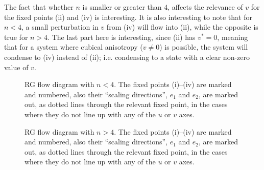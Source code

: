 \documentclass[11pt,letter, swedish, english
]{article}
\begin{document}
The fact that whether $n$ is smaller or greater than $4$, affects the
relevance of $v$ for the fixed points (ii) and (iv) is
interesting. It is also interesting to note that for $n<4$, a small
perturbation in $v$ from (iv) will flow into (ii), while the opposite
is true for $n>4$. The last part here is interesting, since (ii) has
$v^*=0$, meaning that for a system where cubical anisotropy ($v\neq0$)
is possible, the system will condense to (iv) instead of (ii);
i.e. condensing to a state with a clear non-zero value of $v$. 




\begin{figure}
\centering

\caption{RG flow diagram with $n<4$. The fixed points (i)--(iv) are
  marked and numbered, also their ``scaling directions'', $e_1$ and
  $e_2$, are marked out, as dotted lines through the relevant fixed
  point, in the cases where they do not line up with any of the $u$
  or $v$ axes. }
\label{fig:3i}
\end{figure}

\begin{figure}
\centering

\caption{RG flow diagram with $n>4$. The fixed points (i)--(iv) are
  marked and numbered, also their ``scaling directions'', $e_1$ and
  $e_2$, are marked out, as dotted lines through the relevant fixed
  point, in the cases where they do not line up with any of the $u$ 
  or $v$ axes. } 
\label{fig:3ii}
\end{figure}
\end{document}
